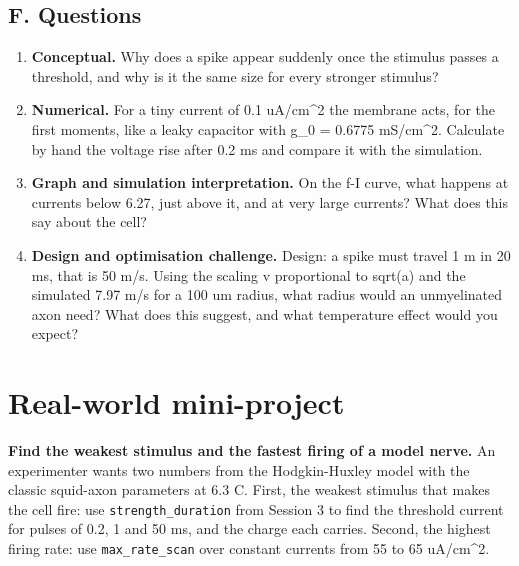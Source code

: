 \documentclass[11pt,a4paper]{article}
\begin{document}
\subsection*{F. Questions}
\begin{enumerate}[nosep]
\item \textbf{Conceptual.} Why does a spike appear suddenly once the stimulus passes a threshold, and why is it the same size for every stronger stimulus?
\item \textbf{Numerical.} For a tiny current of 0.1 uA/cm\textasciicircum{}2 the membrane acts, for the first moments, like a leaky capacitor with g\_0 = 0.6775 mS/cm\textasciicircum{}2. Calculate by hand the voltage rise after 0.2 ms and compare it with the simulation.
\item \textbf{Graph and simulation interpretation.} On the f-I curve, what happens at currents below 6.27, just above it, and at very large currents? What does this say about the cell?
\item \textbf{Design and optimisation challenge.} Design: a spike must travel 1 m in 20 ms, that is 50 m/s. Using the scaling v proportional to sqrt(a) and the simulated 7.97 m/s for a 100 um radius, what radius would an unmyelinated axon need? What does this suggest, and what temperature effect would you expect?
\end{enumerate}

\section{Real-world mini-project}
\textbf{Find the weakest stimulus and the fastest firing of a model nerve.} An experimenter wants two numbers from the Hodgkin-Huxley model with the classic squid-axon parameters at 6.3 C. First, the weakest stimulus that makes the cell fire: use \texttt{strength\_duration} from Session 3 to find the threshold current for pulses of 0.2, 1 and 50 ms, and the charge each carries. Second, the highest firing rate: use \texttt{max\_rate\_scan} over constant currents from 55 to 65 uA/cm\textasciicircum{}2.
\end{document}
